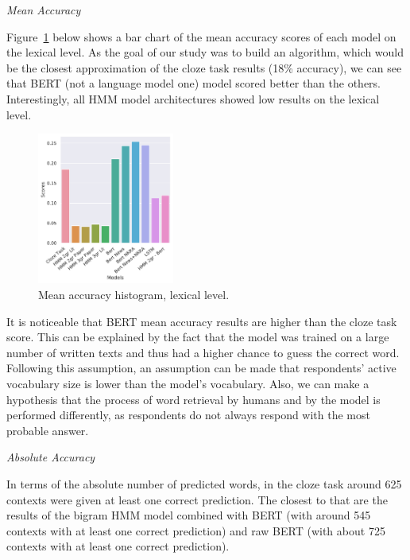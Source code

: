 \documentclass[a4paper]{article}
\newcommand{\head}[1]{\vspace{0.5em}\emph{#1}\vspace{0.25em}}
\begin{document}
\head{Mean Accuracy}

Figure~\ref{fig:mean-accuracy-hist-lex} below shows a bar chart of the mean accuracy scores of each model on
the lexical level. As the goal of our study was to build an algorithm,
which would be the closest approximation of the cloze task results
(18\% accuracy), we can see that BERT (not a language model one) model
scored better than the others. Interestingly, all HMM model
architectures showed low results on the lexical level.

\begin{figure}
\caption{Mean accuracy histogram, lexical level.}
\label{fig:mean-accuracy-hist-lex}
\centering
\includegraphics[width=0.4\textwidth]{figures/pdf/mean-accuracy-hist-lex.pdf}
\end{figure}

It is noticeable that BERT mean accuracy results are higher than the cloze task score. This can be explained by the fact that the model was trained on a large number of written texts and thus had a higher chance to guess the correct word. Following this assumption, an assumption can be made that respondents’ active vocabulary size is lower than the model’s vocabulary. Also, we can make a hypothesis that the process of word retrieval by humans and by the model is performed differently, as respondents do not always respond with the most probable answer.

\head{Absolute Accuracy}

In terms of the absolute number of predicted words, in the cloze task around 625 contexts were given at least one correct prediction. The closest to that are the results of the bigram HMM model combined with BERT (with around 545 contexts with at least one correct prediction) and raw BERT (with about 725 contexts with at least one correct prediction).
\end{document}
